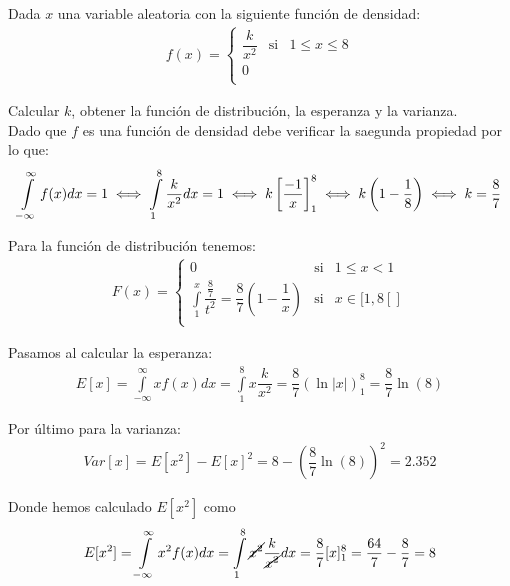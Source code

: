 \begin{ejercicio}[ puntos]
    Dada $x$ una variable aleatoria con la siguiente función de densidad:
    \begin{gather*}
        f(x) = \left\{
        \begin{array}{ccc}
            \dfrac{k}{x^2} & \text{si} & 1 \leq x \leq 8\\
            0 &&\\
        \end{array}
        \right.
    \end{gather*}

    Calcular $k$, obtener la función de distribución, la esperanza y la varianza.\\

    Dado que $f$ es una función de densidad debe verificar la saegunda propiedad por lo que:
    \begin{gather*}
        \int\limits_{-\infty}^{\infty} f(x) dx = 1 \iff \int\limits_{1}^{8} \frac{k}{x^2} dx = 1 \iff k \left[ \dfrac{-1}{x}\right]_ 1^8 \iff k \left(1 - \dfrac{1}{8}\right) \iff k = \dfrac{8}{7}
    \end{gather*}

    Para la función de distribución tenemos:
    \begin{gather*}
        F(x) = \left\{
            \begin{array}{ccc}
                0 & \text{si} & 1 \leq x < 1\\
                \int\limits_1^x \dfrac{\frac{8}{7}}{t^2} = \dfrac{8}{7} \left(1 - \dfrac{1}{x}\right) & \text{si}& x \in [1,8[]\\
            \end{array}
            \right.
    \end{gather*}

    Pasamos al calcular la esperanza:
    \begin{gather*}
        E[x] = \int\limits_{-\infty}^{\infty} xf(x) dx = \int\limits_1^8 x\dfrac{k}{x^2} = \dfrac{8}{7}(\ln|x|)_1^8 = \dfrac{8}{7}\ln(8)
    \end{gather*}

    Por último para la varianza:
    \begin{gather*}
        Var[x] = E[x^2]- E[x]^2 = 8 - \left(\dfrac{8}{7}\ln(8)\right)^2 = 2.352
    \end{gather*}

    Donde hemos calculado $E[x^2]$ como
    \begin{gather*}
        E[x^2] = \int\limits_{-\infty}^{\infty} x^2 f(x) dx = \int\limits_1^8 \cancel{x^2} \frac{k}{\cancel{x^2}} dx = \frac{8}{7}[x]_1^8 = \frac{64}{7} - \frac{8}{7} = 8
    \end{gather*}
\end{ejercicio}

